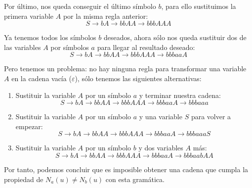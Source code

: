 \documentclass[10pt,a4paper,spanish]{report}
\begin{document}
Por último, nos queda conseguir el último símbolo $b$, para ello sustituimos la primera variable $A$ por la misma regla anterior:
\begin{displaymath}
S \rightarrow bA \rightarrow bbAA \rightarrow bbbAAA
\end{displaymath}

Ya tenemos todos los símbolos $b$ deseados, ahora sólo nos queda sustituir dos de las variables $A$ por símbolos $a$ para llegar al resultado deseado:
\begin{displaymath}
S \rightarrow bA \rightarrow bbAA \rightarrow bbbAAA \rightarrow bbbaaA
\end{displaymath}

Pero tenemos un problema: no hay ninguna regla para transformar una variable $A$ en la cadena vacía ($\varepsilon$), sólo tenemos las siguientes alternativas:
\begin{enumerate}[\color{p1}{$\heartsuit$}]
  \item Sustituir la variable $A$ por un símbolo $a$ y terminar nuestra cadena:
  \begin{displaymath}
  S \rightarrow bA \rightarrow bbAA \rightarrow bbbAAA \rightarrow bbbaaA \rightarrow bbbaaa
  \end{displaymath}
  
  \item Sustituir la variable $A$ por un símbolo $a$ y una variable $S$ para volver a empezar:
  \begin{displaymath}
  S \rightarrow bA \rightarrow bbAA \rightarrow bbbAAA \rightarrow bbbaaA \rightarrow bbbaaaS
  \end{displaymath}

  \item Sustituir la variable $A$ por un símbolo $b$ y dos variables $A$ más:
  \begin{displaymath}
  S \rightarrow bA \rightarrow bbAA \rightarrow bbbAAA \rightarrow bbbaaA \rightarrow bbbaabAA
  \end{displaymath}
\end{enumerate}

Por tanto, podemos concluir que es imposible obtener una cadena que cumpla la propiedad de $N_a(u) \neq N_b(u)$ con esta gramática.

\newpage

\thispagestyle{empty}

\\[3cm]
\end{document}

